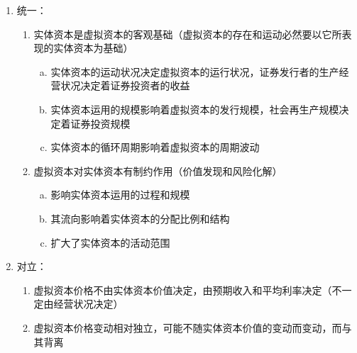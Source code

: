 \documentclass[12pt]{book}
\begin{document}
\begin{enumerate}[1.]
    \item 统一：
          \begin{enumerate}[(1)]
              \item 实体资本是虚拟资本的客观基础（虚拟资本的存在和运动必然要以它所表现的实体资本为基础）
                    \begin{enumerate}[a.]
                        \item 实体资本的运动状况决定虚拟资本的运行状况，证券发行者的生产经营状况决定着证券投资者的收益
                        \item 实体资本运用的规模影响着虚拟资本的发行规模，社会再生产规模决定着证券投资规模
                        \item 实体资本的循环周期影响着虚拟资本的周期波动
                    \end{enumerate}
              \item 虚拟资本对实体资本有制约作用（价值发现和风险化解）
                    \begin{enumerate}[a.]
                        \item 影响实体资本运用的过程和规模
                        \item 其流向影响着实体资本的分配比例和结构
                        \item 扩大了实体资本的活动范围
                    \end{enumerate}
          \end{enumerate}
    \item 对立：
          \begin{enumerate}[(1)]
              \item 虚拟资本价格不由实体资本价值决定，由预期收入和平均利率决定（不一定由经营状况决定）
              \item 虚拟资本价格变动相对独立，可能不随实体资本价值的变动而变动，而与其背离
          \end{enumerate}
\end{enumerate}
\end{document}
